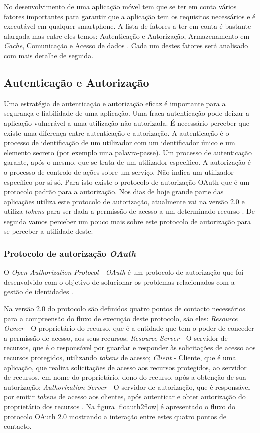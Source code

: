 No desenvolvimento de uma aplicação móvel tem que se ter em conta vários fatores importantes para garantir que a aplicação tem os requisitos necessários e é executável em qualquer smartphone. A lista de fatores a ter em conta é bastante alargada mas entre eles temos: Autenticação e Autorização, Armazenamento em \textit{Cache}, Comunicação e Acesso de dados \cite{mobileappbook}. Cada um destes fatores será analisado com mais detalhe de seguida.


\subsection{Autenticação e Autorização}
Uma estratégia de autenticação e autorização eficaz é importante para a segurança e fiabilidade de uma aplicação. Uma fraca autenticação pode deixar a aplicação vulnerável a uma utilização não autorizada. É necessário perceber que existe uma diferença entre autenticação e autorização. A autenticação é o processo de identificação de um utilizador com um identificador único e um elemento secreto (por exemplo uma palavra-passe). Um processo de autenticação garante, após o mesmo, que se trata de um utilizador específico. A autorização é o processo de controlo de ações sobre um serviço. Não indica um utilizador específico por si só. Para isto existe o protocolo de autorização OAuth \cite{oauth20} que é um protocolo padrão para a autorização. Nos dias de hoje grande parte das aplicações utiliza este protocolo de autorização, atualmente vai na versão 2.0 e utiliza \textit{tokens} para ser dada a permissão de acesso a um determinado recurso \cite{oauth20}. De seguida vamos perceber um pouco mais sobre este protocolo de autorização para se perceber a utilidade deste.


\subsubsection{Protocolo de autorização \textit{OAuth}}
O \textit{Open Authorization Protocol} - \textit{OAuth} é um protocolo de autorização que foi desenvolvido com o objetivo de solucionar os problemas relacionados com a gestão de identidades \cite{leiba_oauth}.
\par
Na versão 2.0 do protocolo são definidos quatro pontos de contacto necessários para a compreensão do fluxo de execução deste protocolo, são eles: \textit{Resource Owner} - O proprietário do recurso, que é a entidade que tem o poder de conceder a permissão de acesso, aos seus recursos; \textit{Resource Server} - O servidor de recursos, que é o responsável por guardar e responder às solicitações de acesso aos recursos protegidos, utilizando \textit{tokens} de acesso; \textit{Client} - Cliente, que é uma aplicação, que realiza solicitações de acesso aos recursos protegidos, ao servidor de recursos, em nome do proprietário, dono do recurso, após a obtenção de sua autorização; \textit{Authorization Server} - O servidor de autorização, que é responsável por emitir \textit{tokens} de acesso aos clientes, após autenticar e obter autorização do proprietário dos recursos \cite{oauth20}. Na figura \ref{f:oauth2flow} é apresentado o fluxo do protocolo OAuth 2.0 mostrando a interação entre estes quatro pontos de contacto.

